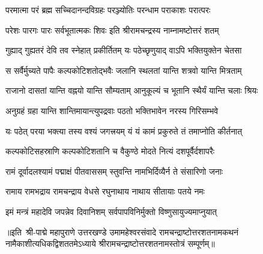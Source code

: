 \twolineshloka
{परमात्मा परं ब्रह्म सच्चिदानन्दविग्रहः}
{परञ्ज्योतिः परन्धाम पराकाशः परात्परः}

\twolineshloka
{परेशः पारगः पारः सर्वभूतात्मकः शिवः}
{इति श्रीरामचन्द्रस्य नाम्नामष्टोत्तरं शतम्}

\resetShloka

\twolineshloka
{गुह्याद् गुह्यतरं देवि तव स्नेहात् प्रकीर्तितम्}
{यः पठेच्छृणुयाद् वाऽपि भक्तियुक्तेन चेतसा}

\twolineshloka
{स सर्वैर्मुच्यते पापैः कल्पकोटिशतोद्भवैः}
{जलानि स्थलतां यान्ति शत्रवो यान्ति मित्रताम्}

\twolineshloka
{राजानो दासतां यान्ति वह्नयो यान्ति सौम्यताम्}
{आनुकूल्यं च भूतानि स्थैर्यं यान्ति चलाः श्रियः}

\twolineshloka
{अनुग्रहं ग्रहा यान्ति शान्तिमायान्त्युपद्रवाः}
{पठतो भक्तिभावेन नरस्य गिरिसम्भवे}

\twolineshloka
{यः पठेत् परया भक्त्या तस्य वश्यं जगत्त्रयम्}
{यं यं कामं प्रकुरुते तं तमाप्नोति कीर्तनात्}

\twolineshloka
{कल्पकोटिसहस्राणि कल्पकोटिशतानि च}
{वैकुण्ठे मोदते नित्यं दशपूर्वैर्दशापरैः}

\twolineshloka
{रामं दूर्वादलश्यामं पद्माक्षं पीतवाससम्}
{स्तुवन्ति नामभिर्दिव्यैर्न ते संसारिणो जनाः}

\twolineshloka
{रामाय रामभद्राय रामचन्द्राय वेधसे}
{रघुनाथाय नाथाय सीतायाः पतये नमः}

\twolineshloka
{इमं मन्त्रं महादेवि जपन्नेव दिवानिशम्}
{सर्वपापविनिर्मुक्तो विष्णुसायुज्यमाप्नुयात्}


{॥इति~श्री-पाद्मे महापुराणे उत्तरखण्डे उमामहेश्वरसंवादे रामचन्द्राष्टोत्तरशतनामकथनं नामैकाशीत्यधिकद्विशततमेऽध्याये श्रीरामचन्द्राष्टोत्तरशतनामस्तोत्रं सम्पूर्णम्॥}
